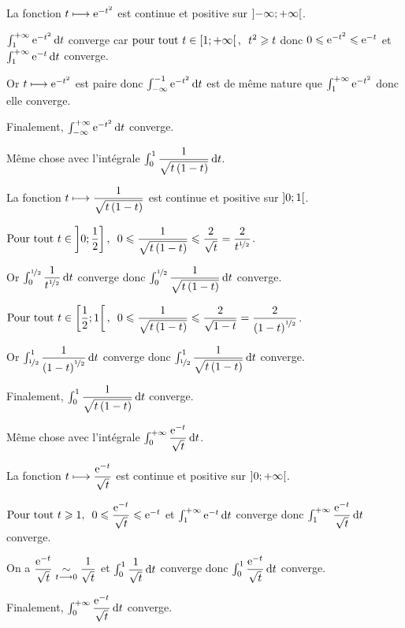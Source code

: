 \begin{corr}
La fonction \(t\longmapsto\mathrm{e}^{-t^2}\) est continue et positive sur \(\left]-\infty;+\infty\right[\).

\(\int_1^{\pinf}\e{-t^2}\odif{t}\) converge car \(\quantifs{\tpt t\in\intervie{1}{\pinf}}t^2\geq t\) donc \(0\leqslant\mathrm{e}^{-t^2}\leqslant\mathrm{e}^{-t}\) et \(\int_1^{\pinf}\e{-t}\odif{t}\) converge.

Or \(t\longmapsto\mathrm{e}^{-t^2}\) est paire donc \(\int_{\minf}^{-1}\e{-t^2}\odif{t}\) est de même nature que \(\int_1^{+\infty}\mathrm{e}^{-t^2}\) donc elle converge.

Finalement, \(\int_{\minf}^{\pinf}\e{-t^2}\odif{t}\) converge.
\end{corr}

\begin{exo}
Même chose avec l'intégrale \(\int_0^1\dfrac{1}{\sqrt{t\paren{1-t}}}\odif{t}\).
\end{exo}

\begin{corr}
La fonction \(t\longmapsto\dfrac{1}{\sqrt{t\left(1-t\right)}}\) est continue et positive sur \(\left]0;1\right[\).

\(\quantifs{\Tpt t\in\intervei{0}{\dfrac{1}{2}}}0\leq\dfrac{1}{\sqrt{t\paren{1-t}}}\leq\dfrac{2}{\sqrt{t}}=\dfrac{2}{t^{\nicefrac{1}{2}}}\).

Or \(\int_0^{\nicefrac{1}{2}}\dfrac{1}{t^{\nicefrac{1}{2}}}\odif{t}\) converge donc \(\int_0^{\nicefrac{1}{2}}\dfrac{1}{\sqrt{t\paren{1-t}}}\odif{t}\) converge.

\(\quantifs{\Tpt t\in\intervie{\dfrac{1}{2}}{1}}0\leq\dfrac{1}{\sqrt{t\paren{1-t}}}\leq\dfrac{2}{\sqrt{1-t}}=\dfrac{2}{\paren{1-t}^{\nicefrac{1}{2}}}\).

Or \(\int_{\nicefrac{1}{2}}^1\dfrac{1}{\paren{1-t}^{\nicefrac{1}{2}}}\odif{t}\) converge donc \(\int_{\nicefrac{1}{2}}^1\dfrac{1}{\sqrt{t\paren{1-t}}}\odif{t}\) converge.

Finalement, \(\int_0^1\dfrac{1}{\sqrt{t\paren{1-t}}}\odif{t}\) converge.
\end{corr}

\begin{exo}
Même chose avec l'intégrale \(\int_0^{\pinf}\dfrac{\e{-t}}{\sqrt{t}}\odif{t}\).
\end{exo}

\begin{corr}
La fonction \(t\longmapsto\dfrac{\mathrm{e}^{-t}}{\sqrt{t}}\) est continue et positive sur \(\left]0;+\infty\right[\).

\(\quantifs{\Tpt t\geq1}0\leq\dfrac{\e{-t}}{\sqrt{t}}\leq\e{-t}\) et \(\int_1^{\pinf}\e{-t}\odif{t}\) converge donc \(\int_1^{\pinf}\dfrac{\e{-t}}{\sqrt{t}}\odif{t}\) converge.

On a \(\dfrac{\mathrm{e}^{-t}}{\sqrt{t}}\underset{t\longrightarrow0}{\sim}\dfrac{1}{\sqrt{t}}\) et \(\int_0^1\dfrac{1}{\sqrt{t}}\odif{t}\) converge donc \(\int_0^1\dfrac{\e{-t}}{\sqrt{t}}\odif{t}\) converge.

Finalement, \(\int_0^{\pinf}\dfrac{\e{-t}}{\sqrt{t}}\odif{t}\) converge.
\end{corr}

